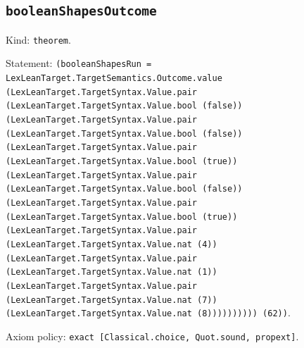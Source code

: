 \documentclass[11pt]{article}
\begin{document}
\subsection*{\texttt{booleanShapesOutcome}}
\noindent Kind: \texttt{theorem}.\par
\noindent Statement: \texttt{(booleanShapesRun = LexLeanTarget.TargetSemantics.Outcome.value (LexLeanTarget.TargetSyntax.Value.pair (LexLeanTarget.TargetSyntax.Value.bool (false)) (LexLeanTarget.TargetSyntax.Value.pair (LexLeanTarget.TargetSyntax.Value.bool (false)) (LexLeanTarget.TargetSyntax.Value.pair (LexLeanTarget.TargetSyntax.Value.bool (true)) (LexLeanTarget.TargetSyntax.Value.pair (LexLeanTarget.TargetSyntax.Value.bool (false)) (LexLeanTarget.TargetSyntax.Value.pair (LexLeanTarget.TargetSyntax.Value.bool (true)) (LexLeanTarget.TargetSyntax.Value.pair (LexLeanTarget.TargetSyntax.Value.nat (4)) (LexLeanTarget.TargetSyntax.Value.pair (LexLeanTarget.TargetSyntax.Value.nat (1)) (LexLeanTarget.TargetSyntax.Value.pair (LexLeanTarget.TargetSyntax.Value.nat (7)) (LexLeanTarget.TargetSyntax.Value.nat (8)))))))))) (62))}.\par
\noindent Axiom policy: \texttt{exact [Classical.choice, Quot.sound, propext]}.\par
\end{document}
